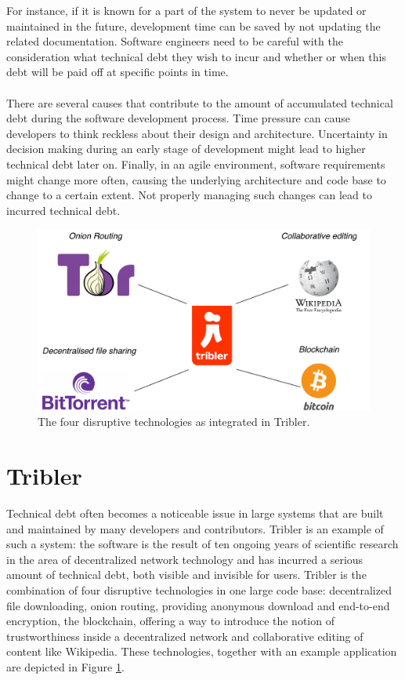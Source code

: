For instance, if it is known for a part of the system to never be updated or maintained in the future, development time can be saved by not updating the related documentation.
Software engineers need to be careful with the consideration what technical debt they wish to incur and whether or when this debt will be paid off at specific points in time.\\\\
There are several causes that contribute to the amount of accumulated technical debt during the software development process\cite{martini2014architecture}. Time pressure can cause developers to think reckless about their design and architecture. Uncertainty in decision making during an early stage of development might lead to higher technical debt later on. Finally, in an agile environment, software requirements might change more often, causing the underlying architecture and code base to change to a certain extent. Not properly managing such changes can lead to incurred technical debt.

\begin{figure}[b!]
	\centering
	\includegraphics[width=0.6\columnwidth]{images/introduction/tribler_connections}
	\caption{The four disruptive technologies as integrated in Tribler.}
	\label{fig:tribler-connections}
\end{figure}

\section{Tribler}
Technical debt often becomes a noticeable issue in large systems that are built and maintained by many developers and contributors. Tribler is an example of such a system: the software is the result of ten ongoing years of scientific research in the area of decentralized network technology and has incurred a serious amount of technical debt, both visible and invisible for users.
Tribler is the combination of four disruptive technologies in one large code base: decentralized file downloading, onion routing, providing anonymous download and end-to-end encryption, the blockchain, offering a way to introduce the notion of trustworthiness inside a decentralized network and collaborative editing of content like Wikipedia. These technologies, together with an example application are depicted in Figure \ref{fig:tribler-connections}.\\

